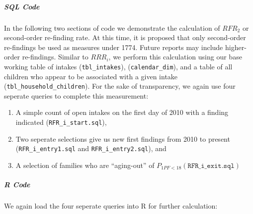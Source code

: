 \documentclass[12pt]{article}\usepackage[]{graphicx}\usepackage[]{color}
\begin{document}
\subparagraph{SQL Code}

In the following two sections of code we demonstrate the calculation of $RFR_2$ or second-order re-finding rate. At this time, it is proposed that only second-order re-findings be used as measures under 1774. Future reports may include higher-order re-findings. Similar to $RRR_i$, we perform this calculation using our base working table of intakes (\texttt{tbl\_intakes}), (\texttt{calendar\_dim}), and a table of all children who appear to be associated with a given intake (\texttt{tbl\_household\_children}). For the sake of transparency, we again use four seperate queries to complete this measurement: 

\begin{enumerate}
  \item A simple count of open intakes on the first day of 2010 with a finding indicated (\texttt{RFR\_i\_start.sql}),
  
  \item Two seperate selections give us new first findings from 2010 to present (\texttt{RFR\_i\_entry1.sql} and \texttt{RFR\_i\_entry2.sql}), and 
  
  
  \item A selection of families who are ``aging-out'' of $P_{1PF<18} (\texttt{RFR\_i\_exit.sql})$
  
\end{enumerate}

\subparagraph{R Code}

We again load the four seperate queries into R for further calculation: 
\end{document}
